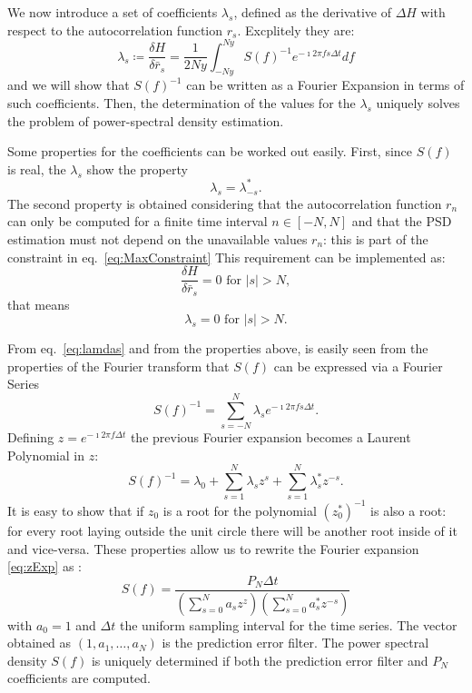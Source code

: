 \documentclass[twocolumn,showpacs,preprintnumbers,nofootinbib,prd,
superscriptaddress,10pt]{revtex4-1}
\begin{document}
We now introduce a set of coefficients $\lambda_s$, defined as the derivative of $\Delta H$ with respect to the autocorrelation function $r_s$.
Excplitely they are:
\begin{equation} \label{eq:lamdas}
      \lambda_s \coloneqq \frac{\delta H}{\delta \bar r_s} = \frac{1}{2Ny}\int_{-Ny}^{Ny} S(f)^{-1}e^{-\imath 2 \pi f s \Delta t } df
\end{equation} 
and we will show that $S(f)^{-1}$ can be written as a Fourier Expansion in terms of such coefficients. Then, the determination of the values for the $\lambda_s$ uniquely solves the problem of power-spectral density estimation.

Some properties for the coefficients can be worked out easily. First, since $S(f)$ is real, the $\lambda_s$ show the property 
\begin{equation}
	\nonumber 
	\lambda_s = \lambda_{-s}^*. 
\end{equation}
The second property is obtained considering that the autocorrelation function $r_n$ can only be computed for a finite time interval $n \in [-N, N]$ and that the PSD estimation must not depend on the unavailable values $r_n$: this is part of the constraint in eq.~\eqref{eq:MaxConstraint}
This requirement can be implemented as:  
\begin{equation}\nonumber 
    \frac{\delta H}{\delta \bar r_s} = 0 \text{ for } \vert s \vert > N,
\end{equation}
that means 
\begin{equation}
\nonumber 
\lambda_s = 0 \text{ for } \vert s \vert > N. 
\end{equation}

From eq.~\eqref{eq:lamdas} and from the properties above, is easily seen from the properties of the Fourier transform that $S(f)$ can be expressed via a Fourier Series 
\begin{equation}\label{eq:PSDconstraint}
    S(f)^{-1} = \sum_{s = -N}^N \lambda_s e^{-\imath 2 \pi f s \Delta t}.
\end{equation}
Defining $z = e^{-\imath 2 \pi f \Delta t}$ the previous Fourier expansion becomes a Laurent Polynomial in $z$: 
\begin{equation}
    \label{eq:zExp}
    S(f)^{-1} = \lambda_0 + \sum_{s = 1}^N \lambda_s z^s + \sum_{s = 1}^N \lambda^*_s z^{-s}.
\end{equation}
It is easy to show that if $z_0$ is a root for the polynomial $(z_0^*)^{-1}$ is also a root: for every root laying outside the unit circle there will be another root inside of it and vice-versa. These properties allow us to rewrite the Fourier expansion \eqref{eq:zExp} as \cite{1975STIN...7714318B}:
\begin{equation}\label{eq:MESApsd_appendix}
    S(f) = \frac{P_N \Delta t}{\left(\sum_{s=0}^N a_s z^z\right)\left(\sum_{s = 0}^N a^*_s z^{-s}\right)}
\end{equation}
with $a_0 = 1$ and $\Delta t$ the uniform sampling interval for the time series. The vector obtained as $(1, a_1, \dots, a_N)$ is the prediction error filter. The power spectral density $S(f)$ is uniquely determined if both the prediction error filter and $P_N$ coefficients are computed.
\end{document}
